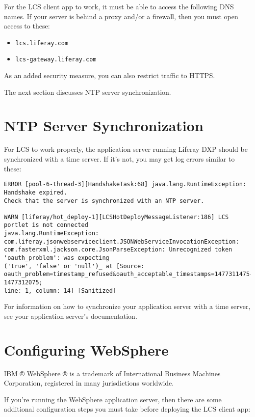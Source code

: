 For the LCS client app to work, it must be able to access the following
DNS names. If your server is behind a proxy and/or a firewall, then you
must open access to these:

\begin{itemize}
\tightlist
\item
  \texttt{lcs.liferay.com}
\item
  \texttt{lcs-gateway.liferay.com}
\end{itemize}

As an added security measure, you can also restrict traffic to HTTPS.

The next section discusses NTP server synchronization.

\section{NTP Server Synchronization}\label{ntp-server-synchronization}

For LCS to work properly, the application server running Liferay DXP
should be synchronized with a time server. If it's not, you may get log
errors similar to these:

\begin{verbatim}
ERROR [pool-6-thread-3][HandshakeTask:68] java.lang.RuntimeException: Handshake expired. 
Check that the server is synchronized with an NTP server. 

WARN [liferay/hot_deploy-1][LCSHotDeployMessageListener:186] LCS portlet is not connected 
java.lang.RuntimeException: com.liferay.jsonwebserviceclient.JSONWebServiceInvocationException: 
com.fasterxml.jackson.core.JsonParseException: Unrecognized token 'oauth_problem': was expecting 
('true', 'false' or 'null')_ at [Source: oauth_problem=timestamp_refused&oauth_acceptable_timestamps=1477311475-1477312075; 
line: 1, column: 14] [Sanitized]
\end{verbatim}

For information on how to synchronize your application server with a
time server, see your application server's documentation.

\section{Configuring WebSphere}\label{configuring-websphere}

IBM ® WebSphere ® is a trademark of International Business Machines
Corporation, registered in many jurisdictions worldwide.

If you're running the WebSphere application server, then there are some
additional configuration steps you must take before deploying the LCS
client app:

